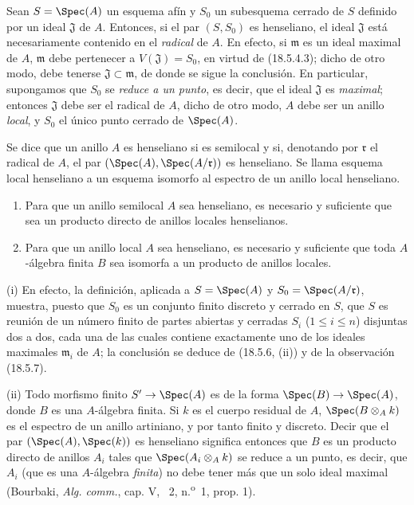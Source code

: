 \begin{remark}[18.5.7]
\label{IV.18.5.7}
Sean $S=\Spec(A)$ un esquema afín y $S_0$ un subesquema cerrado de $S$ definido por un ideal $\mathfrak J$ de $A$. Entonces, si el par $(S,S_0)$ es henseliano, el ideal $\mathfrak J$ está necesariamente contenido en el \emph{radical} de $A$. En efecto, si $\mathfrak m$ es un ideal maximal de $A$, $\mathfrak m$ debe pertenecer a $V(\mathfrak J)=S_0$, en virtud de (18.5.4.3); dicho de otro modo, debe tenerse $\mathfrak J\subset\mathfrak m$, de donde se sigue la conclusión. En particular, supongamos que $S_0$ se \emph{reduce a un punto}, es decir, que el ideal $\mathfrak J$ es \emph{maximal}; entonces $\mathfrak J$ debe ser el radical de $A$, dicho de otro modo, $A$ debe ser un anillo \emph{local}, y $S_0$ el único punto cerrado de $\Spec(A)$.
\end{remark}

\begin{definition}[18.5.8]
\label{IV.18.5.8}
Se dice que un anillo $A$ es henseliano si es semilocal y si, denotando por $\mathfrak r$ el radical de $A$, el par $(\Spec(A),\Spec(A/\mathfrak r))$ es henseliano. Se llama esquema local henseliano a un esquema isomorfo al espectro de un anillo local henseliano.
\end{definition}

\begin{proposition}[18.5.9]
\label{IV.18.5.9}
\begin{enumerate}
  \item[\textup{(i)}] Para que un anillo semilocal $A$ sea henseliano, es necesario y suficiente que sea un producto directo de anillos locales henselianos.
  \item[\textup{(ii)}] Para que un anillo local $A$ sea henseliano, es necesario y suficiente que toda $A$-álgebra finita $B$ sea isomorfa a un producto de anillos \textup{locales}.
\end{enumerate}
\end{proposition}

(i) En efecto, la definición, aplicada a $S=\Spec(A)$ y $S_0=\Spec(A/\mathfrak r)$, muestra, puesto que $S_0$ es un conjunto finito discreto y cerrado en $S$, que $S$ es reunión de un número finito de partes abiertas y cerradas $S_i$ ($1\leq i\leq n$) disjuntas dos a dos, cada una de las cuales contiene exactamente uno de los ideales maximales $\mathfrak m_i$ de $A$; la conclusión se deduce de (18.5.6, (ii)) y de la observación (18.5.7).

(ii) Todo morfismo finito $S'\to\Spec(A)$ es de la forma $\Spec(B)\to\Spec(A)$, donde $B$ es una $A$-álgebra finita. Si $k$ es el cuerpo residual de $A$, $\Spec(B\otimes_A k)$ es el espectro de un anillo artiniano, y por tanto finito y discreto. Decir que el par $(\Spec(A),\Spec(k))$ es henseliano significa entonces que $B$ es un producto directo de anillos $A_i$ tales que $\Spec(A_i\otimes_A k)$ se reduce a un punto, es decir, que $A_i$ (que es una $A$-álgebra \emph{finita}) no debe tener más que un solo ideal maximal (Bourbaki, \emph{Alg. comm.}, cap. V, \textsection~2, n.\textsuperscript{o}~1, prop. 1).

